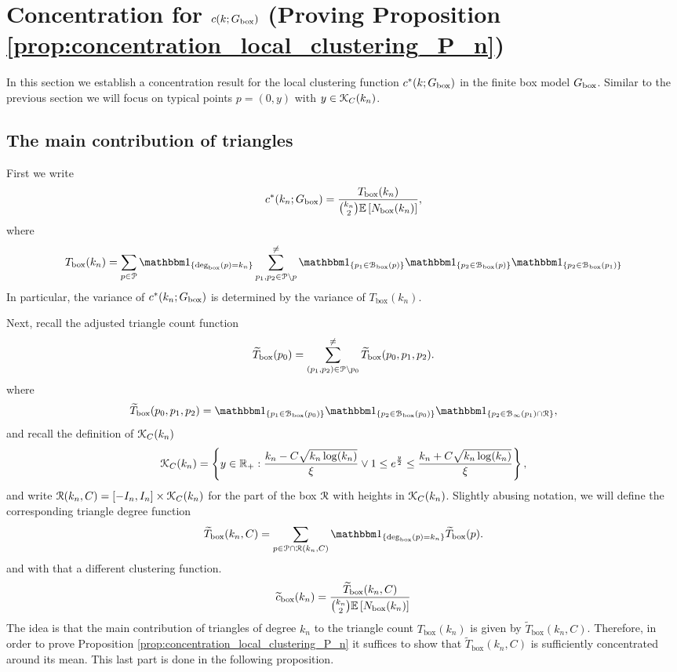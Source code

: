 \section{Concentration for $c(k; G_{\text{box}})$ (Proving Proposition \ref{prop:concentration_local_clustering_P_n})}
\label{sec:concentration_c_P_n}

In this section we establish a concentration result for the local clustering function $c^\ast(k; G_{\text{box}})$ in the finite box model $G_{\text{box}}$. Similar to the previous section we will focus on typical points $p = (0,y)$ with $y \in {\mathcal K}_{C}(k_n)$.

\subsection{The main contribution of triangles}

First we write
\[
	c^\ast(k_n ; G_{\text{box}}) = \frac{T_{\text{box}}(k_n)}{\binom{k_n}{2}\mathbb{E}\left[N_{\text{box}}(k_n)\right]},
\]
where
\[
	 T_{\text{box}}(k_n) = \sum_{p \in \Pcal} \ind{\Dbox(p) = k_n} \sum_{p_1, p_2 \in \Pcal \setminus p}^{\ne} 
	 \ind{p_1 \in \BallPon{p}}\ind{p_2 \in \BallPon{p}}\ind{p_2 \in \BallPon{p_1}}
\]
In particular, the variance of $c^\ast(k_n ; G_{\text{box}})$ is determined by the variance of $T_{\text{box}}(k_n)$.

Next, recall the adjusted triangle count function
\[
	\widetilde{T}_{\text{box}}(p_0) = \sum_{(p_1, p_2) \in {\mathcal P} \setminus p_0}^{\ne} 
		\widetilde{T}_{\text{box}}(p_0,p_1,p_2).
\]
where
\[
	\widetilde{T}_{\text{box}}(p_0,p_1,p_2) = \ind{p_1 \in \BallPon{p_0}}\ind{p_2 \in \BallPon{p_0}}\ind{p_2 \in \BallPo{p_1} \cap \Rcal},
\]
and recall the definition of ${\mathcal K}_{C}(k_n)$
\[
	{\mathcal K}_{C}(k_n) = \left\{y \in {\ensuremath{\mathbb R}}_+ : \frac{k_n - C \sqrt{k_n \log(k_n)}}{\xi} \vee 1 \le e^{\frac{y}{2}}
		\le \frac{k_n + C \sqrt{k_n \log(k_n)}}{\xi} \right\},
\]
and write ${\mathcal R}(k_n,C) = [-I_n,I_n] \times {\mathcal K}_{C}(k_n)$ for the part of the box ${\mathcal R}$ with heights in ${\mathcal K}_{C}(k_n)$.
Slightly abusing notation, we will define the corresponding triangle degree function
\begin{equation}\label{eq:def_degree_triangle_count_in_K}
	\widetilde{T}_{\text{box}}(k_n, C) = \sum_{p \in \Pcal \cap \Rcal(k_n,C)} \ind{\text{deg}_{\text{box}}(p) = k_n} \widetilde{T}_{\text{box}}(p).
\end{equation}
and with that a different clustering function.
\begin{equation}\label{eq:def_tilde_c_box}
	\widetilde{c}_{\text{box}}(k_n) = \frac{\widetilde{T}_{\text{box}}(k_n,C)}{\binom{k_n}{2}\mathbb{E}\left[N_{\text{box}}(k_n)\right]}
\end{equation}
The idea is that the main contribution of triangles of degree $k_n$ to the triangle count $T_{\text{box}}(k_n)$ is given by $\widetilde{T}_{\text{box}}(k_n, C)$. Therefore, in order to prove Proposition \ref{prop:concentration_local_clustering_P_n} it suffices to show that $\widetilde{T}_{\text{box}}(k_n,C)$ is sufficiently concentrated around its mean. This last part is done in the following proposition.

